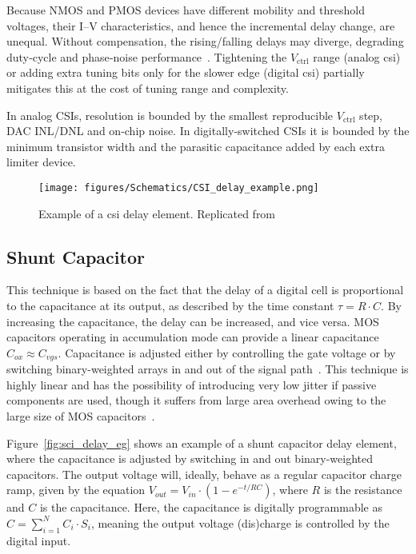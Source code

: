 Because NMOS and PMOS devices have different mobility and threshold voltages, their I--V characteristics, and hence the incremental delay change, are unequal.  Without compensation, the rising/falling delays may diverge, degrading duty‑cycle and phase‑noise performance~\cite{Heck2015optimization}.  Tightening the $V_{\mathrm{ctrl}}$ range (analog \gls{csi}) or adding extra tuning bits only for the slower edge (digital \gls{csi}) partially mitigates this at the cost of tuning range and complexity.

In analog CSIs, resolution is bounded by the smallest reproducible $V_{\mathrm{ctrl}}$ step, DAC INL/DNL and on‑chip noise.  In digitally‑switched CSIs it is bounded by the minimum transistor width and the parasitic capacitance added by each extra limiter device.


\begin{figure}[hb]
    \centering
    \texttt{[image: figures/Schematics/CSI\_delay\_example.png]}
    \caption{Example of a \gls{csi} delay element. Replicated from~\protect\cite{maymandi2003digitally}}\label{fig:csi_delay_eg}
\end{figure}

\subsection{Shunt Capacitor}
This technique is based on the fact that the delay of a digital cell is proportional to the capacitance at its output, as described by the time constant $ \tau = R \cdot C $. By increasing the capacitance, the delay can be increased, and vice versa.
MOS capacitors operating in accumulation mode can provide a linear capacitance $C_{ox}\approx C_{vgs}$. Capacitance is adjusted either by controlling the gate voltage or by switching binary-weighted arrays in and out of the signal path~\cite{andreani1998shunt}.
This technique is highly linear and has the possibility of introducing very low jitter if passive components are used, though it suffers from large area overhead owing to the large size of MOS capacitors~\cite{pao2005portable}.

Figure~\ref{fig:sci_delay_eg} shows an example of a shunt capacitor delay element, where the capacitance is adjusted by switching in and out binary-weighted capacitors. The output voltage will, ideally, behave as a regular capacitor charge ramp, given by the equation $ V_{out} = V_{in} \cdot (1 - e^{-t/RC}) $, where $ R $ is the resistance and $ C $ is the capacitance. Here, the capacitance is digitally programmable as \(C = \sum_{i=1}^{N} C_i \cdot S_i\), meaning the output voltage (dis)charge is controlled by the digital input.

